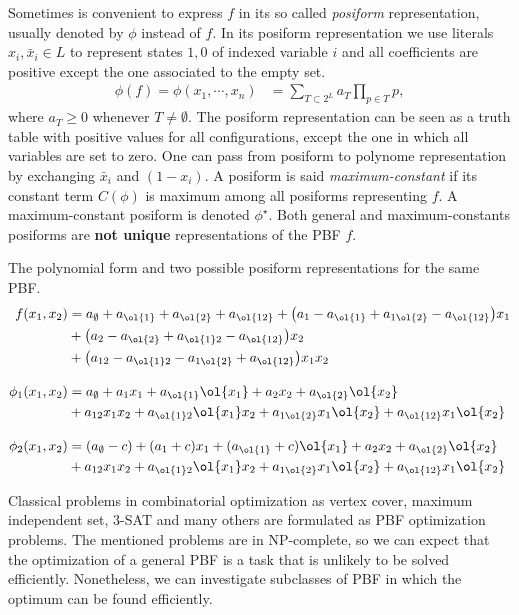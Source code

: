 Sometimes is convenient to express $f$ in its so called \emph{posiform} representation, usually denoted by $\phi$ instead of $f$. In its posiform representation we use literals $x_i,\bar{x}_i \in L$  to represent states $1,0$ of indexed variable $i$ and all coefficients are positive except the one associated to the empty set.
\begin{align}
	\phi(f) = \phi(x_1,\cdots,x_n) &= \sum_{T \subset 2^{L}}a_T{\prod_{p \in T}{p}},
\end{align}
%
where $a_T \geq 0$ whenever $T\neq \emptyset$. The posiform representation can be seen as a truth table with positive values for all configurations, except the one in which all variables are set to zero. One can pass from posiform to polynome representation by exchanging $\bar{x}_i$ and $(1-x_i)$. A posiform is said \emph{maximum-constant}  if its constant term $C(\phi)$ is maximum among all posiforms representing $f$. A maximum-constant posiform is denoted $\phi^{\star}$. Both general and maximum-constants posiforms are \textbf{not unique} representations of the PBF $f$.

\begin{example}The polynomial form and two possible posiform representations for the same PBF.
\begin{align*}
	f(x_1,x_2) &= a_{\emptyset} + a_\ol{1} + a_\ol{2} + a_\ol{12} + \big(a_1 - a_\ol{1} + a_{1\ol{2}} - a_\ol{12}\big)x_1 \\
	&+ \big(a_{2} - a_\ol{2} + a_{\ol{1}2} - a_{\ol{12}}\big)x_2\\ 
	&+ \big(a_{12} - a_{\ol{1}2} - a_{1\ol{2}} + a_{\ol{12}}\big)x_1x_2 \\[1em]
	\phi_1(x_1,x_2) &= a_{\emptyset} + a_1x_1 + a_\ol{1}\ol{x_1} + a_2x_2 + a_\ol{2}\ol{x_2} \\ 
			&+ a_{12}x_1x_2 + a_{\ol{1}2}\ol{x_1}x_2 + a_{1\ol{2}}x_1\ol{x_2} + a_{\ol{12}}x_1\ol{x_2} \\[1em]			
	\phi_2(x_1,x_2) &= (a_{\emptyset}-c) + (a_1+c)x_1 + (a_\ol{1}+c)\ol{x_1} + a_2x_2 + a_\ol{2}\ol{x_2} \\ 
			&+ a_{12}x_1x_2 + a_{\ol{1}2}\ol{x_1}x_2 + a_{1\ol{2}}x_1\ol{x_2} + a_{\ol{12}}x_1\ol{x_2} 	
\end{align*}
\end{example}
%
Classical problems in combinatorial optimization as vertex cover, maximum independent set, $3$-SAT and many others are formulated as PBF optimization problems. The mentioned problems are in NP-complete, so we can expect that the optimization of a general PBF is a task that is unlikely to be solved efficiently. Nonetheless, we can investigate subclasses of PBF in which the optimum can be found efficiently.

